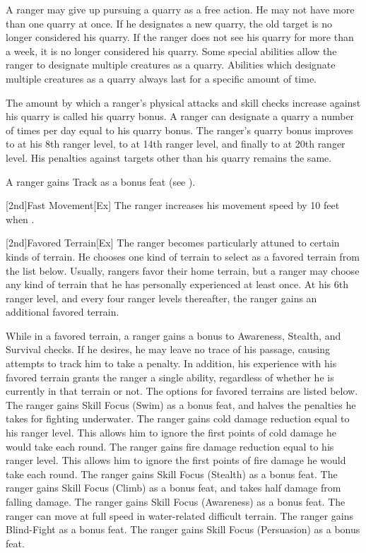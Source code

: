 A ranger may give up pursuing a quarry as a free action.
He may not have more than one quarry at once.
If he designates a new quarry, the old target is no longer considered his quarry.
If the ranger does not see his quarry for more than a week, it is no longer considered his quarry.
Some special abilities allow the ranger to designate multiple creatures as a quarry.
Abilities which designate multiple creatures as a quarry always last for a specific amount of time.

\par The amount by which a ranger's physical attacks and skill checks increase against his quarry is called his quarry bonus.
A ranger can designate a quarry a number of times per day equal to his quarry bonus.
The ranger's quarry bonus improves to  at his 8th ranger level, to  at 14th ranger level, and finally to  at 20th ranger level.
His penalties against targets other than his quarry remains the same.

A ranger gains Track as a bonus feat (see ).

[2nd]{Fast Movement}[Ex]
The ranger increases his movement speed by 10 feet when \unencumbered.

[2nd]{Favored Terrain}[Ex]
The ranger becomes particularly attuned to certain kinds of terrain.
He chooses one kind of terrain to select as a favored terrain from the list below.
Usually, rangers favor their home terrain, but a ranger may choose any kind of terrain that he has personally experienced at least once.
At his 6th ranger level, and every four ranger levels thereafter, the ranger gains an additional favored terrain.

\par While in a favored terrain, a ranger gains a  bonus to Awareness, Stealth, and Survival checks.
If he desires, he may leave no trace of his passage, causing attempts to track him to take a  penalty.
In addition, his experience with his favored terrain grants the ranger a single ability, regardless of whether he is currently in that terrain or not.
The options for favored terrains are listed below.
The ranger gains Skill Focus (Swim) as a bonus feat, and halves the penalties he takes for fighting underwater.
The ranger gains cold damage reduction equal to his ranger level.
This allows him to ignore the first points of cold damage he would take each round.
The ranger gains fire damage reduction equal to his ranger level.
This allows him to ignore the first points of fire damage he would take each round.
The ranger gains Skill Focus (Stealth) as a bonus feat.
The ranger gains Skill Focus (Climb) as a bonus feat, and takes half damage from falling damage.
The ranger gains Skill Focus (Awareness) as a bonus feat.
The ranger can move at full speed in water-related difficult terrain.
The ranger gains Blind-Fight as a bonus feat.
The ranger gains Skill Focus (Persuasion) as a bonus feat.

